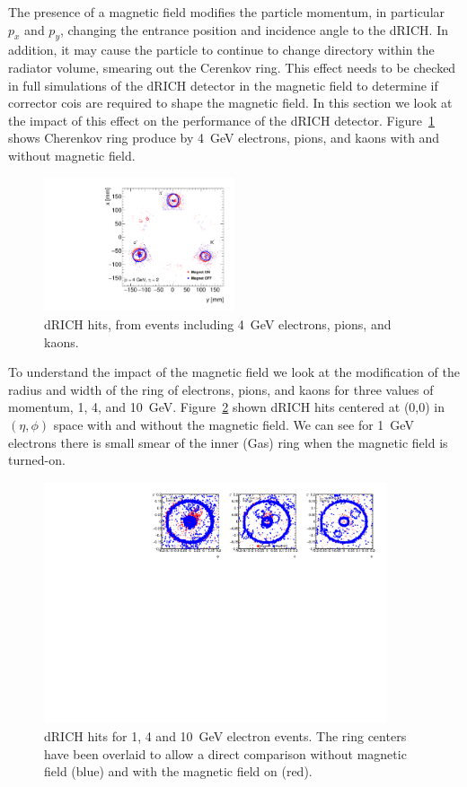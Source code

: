 The presence of a magnetic field modifies the particle momentum, in particular $p_{x}$ and $p_{y}$, changing the entrance position and incidence angle to the dRICH. In addition, it may cause the particle to continue to change directory within the radiator volume, smearing out the Cerenkov ring. This effect needs to be checked in full simulations of the dRICH detector in the magnetic field to determine if corrector cois are required to shape the magnetic field. In this section we look at the impact of this effect on the performance of the dRICH detector. Figure~\ref{fig:drich_p4_xy} shows Cherenkov ring produce by 4~GeV electrons, pions, and kaons with and without magnetic field. 
\begin{figure}[h!tbp]
    \centering
    \includegraphics[width=0.5\textwidth]{figs/rings_xy_p4_fornote.pdf}
    \caption{dRICH hits, from events including 4~GeV electrons, pions, and kaons.}
    \label{fig:drich_p4_xy}
\end{figure}
To understand the impact of the magnetic field we look at the modification of the radius and width of the ring of electrons, pions, and kaons for three values of momentum, 1, 4, and 10~GeV. Figure~\ref{fig:drich_pX_e} shown dRICH hits centered at (0,0) in $(\eta,\phi)$ space with and without the magnetic field. We can see for 1~GeV electrons there is small smear of the inner (Gas) ring when the magnetic field is turned-on. 
\begin{figure}[h!tbp]
    \centering
    \includegraphics[width=0.9\textwidth]{figs/rings_etaphi_electron.pdf}
    \caption{dRICH hits for 1, 4 and 10~GeV electron events. The ring centers have been overlaid to allow a direct comparison without magnetic field (blue) and with the magnetic field on (red). }
    \label{fig:drich_pX_e}
\end{figure}
